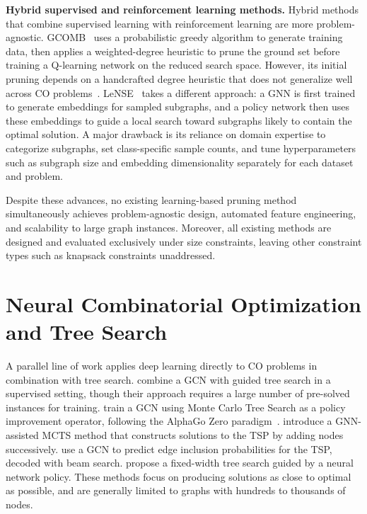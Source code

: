\textbf{Hybrid supervised and reinforcement learning methods.}
Hybrid methods that combine supervised learning with reinforcement learning are more
problem-agnostic. GCOMB~\citep{manchanda2020gcomb} uses a probabilistic greedy
algorithm to generate training data, then applies a weighted-degree heuristic to prune
the ground set before training a Q-learning network on the reduced search space. However,
its initial pruning depends on a handcrafted degree heuristic that does not generalize
well across CO problems~\citep{ireland2022lense}. LeNSE~\citep{ireland2022lense} takes a
different approach: a GNN is first trained to generate embeddings for sampled subgraphs,
and a policy network then uses these embeddings to guide a local search toward subgraphs
likely to contain the optimal solution. A major drawback is its reliance on domain
expertise to categorize subgraphs, set class-specific sample counts, and tune
hyperparameters such as subgraph size and embedding dimensionality separately for each
dataset and problem.

Despite these advances, no existing learning-based pruning method simultaneously achieves
problem-agnostic design, automated feature engineering, and scalability to large
graph instances. Moreover, all existing methods are designed and evaluated exclusively
under size constraints, leaving other constraint types such as knapsack constraints
unaddressed.

\section{Neural Combinatorial Optimization and Tree Search}

A parallel line of work applies deep learning directly to CO problems in combination
with tree search. \citet{li2018combinatorial} combine a GCN with guided tree search in a
supervised setting, though their approach requires a large number of pre-solved instances
for training. \citet{abe2019solving} train a GCN using Monte Carlo Tree Search as a policy
improvement operator, following the AlphaGo Zero paradigm~\citep{silver2017mastering}.
\citet{xing2020graph} introduce a GNN-assisted MCTS method that constructs solutions to
the TSP by adding nodes successively. \citet{joshi2019efficient} use a GCN to predict
edge inclusion probabilities for the TSP, decoded with beam search.
\citet{choo2022simulation} propose a fixed-width
tree search guided by a neural network policy. These methods focus on producing solutions
as close to optimal as possible, and are generally limited to graphs with hundreds to
thousands of nodes.

